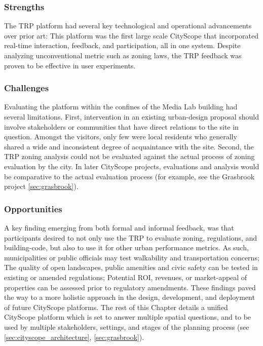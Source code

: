 {{        \subsubsection{Strengths}
        {
            The TRP platform had several key technological and operational advancements over prior art: This platform was the first large scale CityScope that incorporated real-time interaction, feedback, and participation, all in one system. Despite analyzing unconventional metric such as zoning laws, the TRP feedback was proven to be effective in user experiments.
        }

        \subsubsection{Challenges}

        {
            Evaluating the platform within the confines of the Media Lab building had several limitations. First, intervention in an existing urban-design proposal should involve stakeholders or communities that have direct relations to the site in question. Amongst the visitors, only few were local residents who generally shared a wide and inconsistent degree of acquaintance with the site.
            Second, the TRP zoning analysis could not be evaluated against the actual process of zoning evaluation by the city. In later CityScope projects, evaluations and analysis would be comparative to the actual evaluation process (for example, see the Grasbrook project \eqref{sec:grasbrook}).
        }

        \subsubsection{Opportunities}
        {
            A key finding emerging from both formal and informal feedback, was that participants desired to not only use the TRP to evaluate zoning, regulations, and building-code, but also to use it for other urban performance metrics. As such, municipalities or public officials may test walkability and transportation concerns; The quality of open landscapes, public amenities and civic safety can be tested in existing or amended regulations; Potential ROI, revenues, or market-appeal of properties can be assessed prior to regulatory amendments.
        }
        \newline
        These findings paved the way to a more holistic approach in the design, development, and deployment of future CityScope platforms. The rest of this Chapter details a unified CityScope platform which is set to answer multiple spatial questions, and to be used by multiple stakeholders, settings, and stages of the planning process (see \eqref{sec:cityscope_architecture}, \eqref{sec:grasbrook}).

    }
}